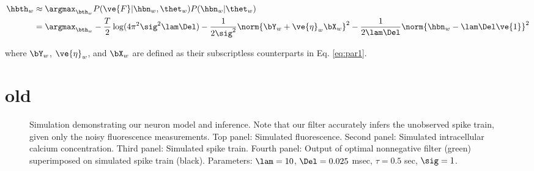 \documentclass[12pt]{article}
\newcommand{\hC}{\widehat{C}}
\newcommand{\hn}{\widehat{n}}
\newcommand{\zzz}{z}
\newcommand{\xT}{\ve{C}}
\newcommand{\zT}{\ve{n}}
\newcommand{\lT}{\ve{\lam}}
\begin{document}
\begin{subequations}
\begin{align} \label{eq:w_par}
\hbth_w &\approx \argmax_{\bth_w}P(\ve{F}| \hbn_w, \thet_w) P(\hbn_w | \thet_w) \\
&= \argmax_{\bth_w} -\frac{T}{2} \log (4\pi^2\sig^2\lam\Del) - \frac{1}{2\sig^2} \norm{\bY_w + \ve{\eta}_w \bX_w}^2 - \frac{1}{2\lam\Del} \norm{\hbn_w - \lam\Del\ve{1}}^2
\end{align}
\end{subequations}

\noindent where $\bY_w$, $\ve{\eta}_w$, and $\bX_w$ are defined as their subscriptless counterparts in Eq. \eqref{eq:par1}.



\section{old}


\begin{figure}
\caption{Simulation demonstrating our neuron model and inference. Note that our filter accurately infers the unobserved spike train, given only the noisy fluorescence measurements.  Top panel: Simulated fluorescence. Second panel: Simulated intracellular calcium concentration. Third panel: Simulated spike train.  Fourth panel: Output of optimal nonnegative filter (green) superimposed on simulated spike train (black).  Parameters: $\lam=10$, $\Del=0.025$ msec, $\tau=0.5$ sec, $\sig=1$.} \label{fig:demo}
\end{figure}
\end{document}
